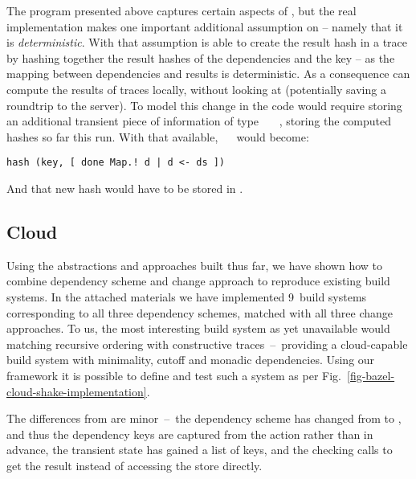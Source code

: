 The program presented above captures certain aspects of \Bazel, but the real
implementation makes one important additional assumption on  -- namely
that it is \textit{deterministic}. With that assumption \Bazel is able to create
the result hash in a trace by hashing together the result hashes of the
dependencies and the key -- as the mapping between dependencies and results is
deterministic. As a consequence \Bazel can compute the results of traces locally,
without looking at  (potentially saving a roundtrip to the server).
To model this change in the code would require storing an additional transient
piece of information  of type ~~~,
storing the computed hashes so far this run. With that available,
~~ would become:
\begin{verbatim}
hash (key, [ done Map.! d | d <- ds ])
\end{verbatim}
And that new hash would have to be stored in .

\subsection{Cloud \Shake}\label{sec-implementation-cloud-shake}

Using the abstractions and approaches built thus far, we have shown how to
combine dependency scheme and change approach to reproduce existing build
systems. In the attached materials we have implemented 9~build systems
corresponding to all three dependency schemes, matched with all three change
approaches. To us, the most interesting build system as yet unavailable would
matching recursive ordering with constructive traces~--~providing a cloud-capable
build system with minimality, cutoff and monadic dependencies. Using our
framework it is possible to define and test such a system as per
Fig.~\ref{fig-bazel-cloud-shake-implementation}.

The differences from  are minor~--~the dependency scheme has changed
from  to , and thus the dependency keys 
are captured from the action rather than in advance, the transient state has
gained a list of keys, and the checking calls  to get the result
instead of accessing the store directly.

